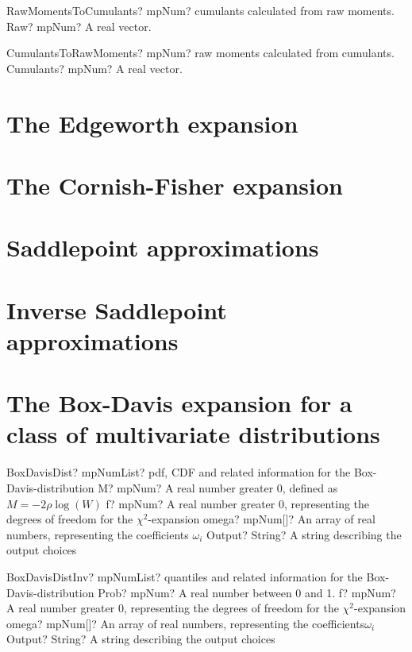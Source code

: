 \documentclass[12pt,a4paper,openany]{book}
\begin{document}
\begin{mpFunctionsExtract}
\mpFunctionOneNotImplemented
{RawMomentsToCumulants? mpNum? cumulants calculated from raw moments.}
{Raw? mpNum? A real vector.}
\end{mpFunctionsExtract}

\begin{mpFunctionsExtract}
\mpFunctionOneNotImplemented
{CumulantsToRawMoments? mpNum? raw moments calculated from cumulants.}
{Cumulants? mpNum? A real vector.}
\end{mpFunctionsExtract}

\section{The Edgeworth expansion}

\section{The Cornish-Fisher expansion}

\section{Saddlepoint approximations}

\section{Inverse Saddlepoint approximations}

\section[The Box-Davis expansion]{The Box-Davis expansion for a class of multivariate distributions}

\begin{mpFunctionsExtract}
\mpFunctionFourNotImplemented
{BoxDavisDist? mpNumList? pdf, CDF and related information for the Box-Davis-distribution}
{M? mpNum? A real number greater 0, defined as $M=-2 \rho \log(W)$}
{f? mpNum? A real number greater 0, representing the degrees of freedom for the $\chi^2$-expansion}
{omega? mpNum[]? An array of real numbers, representing the coefficients $\omega_i$}
{Output? String? A string describing the output choices}
\end{mpFunctionsExtract}

\begin{mpFunctionsExtract}
\mpFunctionFourNotImplemented
{BoxDavisDistInv? mpNumList? quantiles and related information for the Box-Davis-distribution}
{Prob? mpNum? A real number between 0 and 1.}
{f? mpNum? A real number greater 0, representing the degrees of freedom for the $\chi^2$-expansion}
{omega? mpNum[]? An array of real numbers, representing the coefficients$\omega_i$}
{Output? String? A string describing the output choices}
\end{mpFunctionsExtract}
\end{document}
